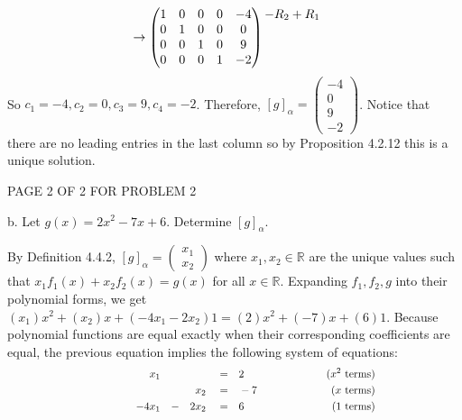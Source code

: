 \documentclass[12pt]{article}
\newenvironment{problem}[2][Problem]
{
	\begin{trivlist} 
		\item[\hskip \labelsep {\bfseries #1 #2:}]
	}
{
	\end{trivlist}
	}
\newenvironment{solution}[1][Solution]
{
	\begin{trivlist} 
		\item[\hskip \labelsep {\itshape #1:}]
	}
	{
	\end{trivlist}
}
\begin{document}
\begin{problem}{5}
\begin{solution}
\begin{align*}
&\rightarrow \begin{pmatrix}1&0&0&0&-4 \\ 0&1&0&0&0 \\ 0&0&1&0&9 \\ 0&0&0&1&-2\end{pmatrix} \begin{matrix} -R_2+R_1\hphantom{1} \\ \hphantom{1} \\ \hphantom{1} \\ \hphantom{1} \end{matrix}
\end{align*}
So $c_1 = -4, c_2=0,c_3=9,c_4=-2$. Therefore, $[g]_{\alpha} =  \begin{pmatrix} -4\\0\\9\\-2\end{pmatrix}$. Notice that there are no leading entries in the last column so by Proposition 4.2.12 this is a unique solution.
\end{solution}
\vfill
\centerline{PAGE 2 OF 2 FOR PROBLEM 2}
%
%
%
%
%
\newpage
\noindent
\newline
\newline
b. Let $g(x)=2x^2-7x+6$. Determine $[g]_{\alpha}$.
\begin{solution}
By Definition 4.4.2, $[g]_{\alpha} = \begin{pmatrix} x_1\\x_2\end{pmatrix}$ where $x_1,x_2 \in \mathbb{R}$ are the unique values such that  $x_1 f_1(x) + x_2 f_2(x) = g(x)$ for all $x \in \mathbb{R}$. Expanding $f_1,f_2,g$ into their polynomial forms, we get $(x_1)x^2+(x_2)x +(-4x_1-2x_2)1= (2)x^2+(-7)x+(6)1$. Because polynomial functions are equal exactly when their corresponding coefficients are equal, the previous equation implies the following system of equations:
\begin{align*}
&&&&&&&& &&&&&&&& &&&&&&&& &x_1& &\hphantom{1}& &\hphantom{1}& &=& &2&  &&&&&&&& \hphantom{100} \text{($x^2$ terms)} &&&&&&&& &&&&&&&& \\
&&&&&&&& &&&&&&&& &&&&&&&& &\hphantom{1}& &\hphantom{1}& &x_2& &=& &-7&  &&&&&&&& \hphantom{100} \text{($x$ terms)} &&&&&&&& &&&&&&&& \\
&&&&&&&& &&&&&&&& &&&&&&&& -4&x_1& &-& 2&x_2& &=& &6&  &&&&&&&& \hphantom{100} \text{($1$ terms)} &&&&&&&& &&&&&&&& \\
\end{align*}

\end{solution}
\end{problem}
\end{document}
